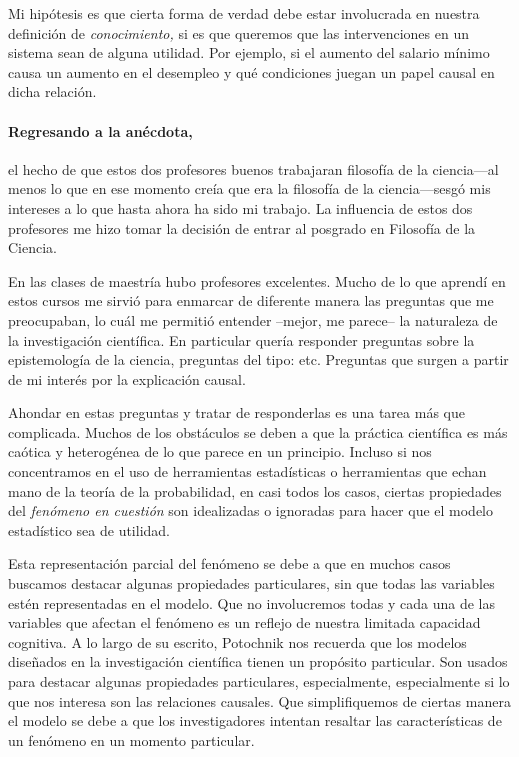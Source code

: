{Mi hipótesis es que cierta forma de verdad debe estar
involucrada en nuestra definición de \emph{conocimiento,} si
es que queremos que las intervenciones en un sistema sean de
alguna utilidad. Por ejemplo, si el aumento del salario
mínimo causa un aumento en el desempleo y qué condiciones
juegan un papel causal en dicha relación.

\paragraph{Regresando a la anécdota,} el hecho de que estos
dos profesores buenos trabajaran filosofía de la ciencia---al
menos lo que en ese momento creía que era la filosofía de la
ciencia---sesgó mis intereses a lo que hasta ahora ha sido mi
trabajo. La influencia de estos dos profesores me hizo tomar
la decisión de entrar al posgrado en Filosofía de la Ciencia.

En las clases de maestría hubo profesores excelentes. Mucho
de lo que aprendí en estos cursos me sirvió para enmarcar de
diferente manera las preguntas que me preocupaban, lo cuál
me permitió entender --mejor, me parece-- la naturaleza de
la investigación científica. En particular quería
responder preguntas sobre la epistemología de la ciencia,
preguntas del tipo:    etc. Preguntas que
surgen a partir de mi interés por la explicación causal.

Ahondar en estas preguntas y tratar de responderlas es una
tarea más que complicada. Muchos de los obstáculos se
deben a que la práctica científica es más caótica y
heterogénea de lo que parece en un principio. Incluso si
nos concentramos en el uso de herramientas estadísticas o
herramientas que echan mano de la teoría de la
probabilidad, en casi todos los casos, ciertas propiedades
del \emph{fenómeno en cuestión} son idealizadas o
ignoradas para hacer que el modelo estadístico sea de
utilidad.

Esta representación parcial del fenómeno se debe a que en
muchos casos buscamos destacar algunas propiedades
particulares, sin que todas las variables estén
representadas en el modelo. Que no involucremos todas y cada
una de las variables que afectan el fenómeno es un reflejo
de nuestra limitada capacidad cognitiva. A lo largo de su
escrito, Potochnik nos recuerda que los modelos diseñados en
la investigación científica tienen un propósito particular.
Son usados para destacar algunas propiedades particulares,
especialmente, especialmente si lo que nos interesa son
las relaciones causales. Que simplifiquemos de ciertas manera el
modelo se debe a que los investigadores intentan resaltar las
características de un fenómeno en un momento particular.

}
